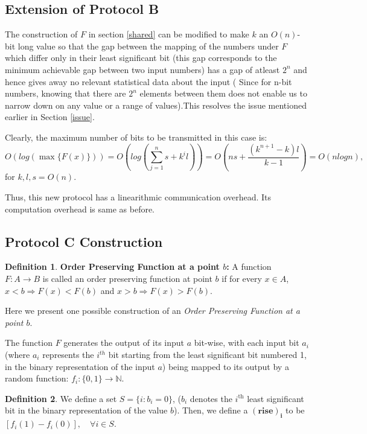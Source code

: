 \documentclass[11pt, letterpaper, romanappendices, onecolumn]{article}
\theoremstyle{plain}\newtheorem{thm}{Theorem}[section]
\theoremstyle{definition}
\newtheorem{defn}{Definition}[section]
\theoremstyle{remark}
\begin{document}
\subsection{Extension of Protocol \textsf{B}}\label{sec:ext}
The construction of $F$ in section \ref{shared} can be modified to make $k$ an $O(n)$-bit long value so that the gap between the mapping of the numbers under $F$ which differ only in their least significant bit (this gap corresponds to the minimum achievable gap between two input numbers) has a gap of atleast $2^n$ and hence gives away no relevant statistical data about the input ( Since for n-bit numbers, knowing that there are $2^n$ elements between them does not enable us to narrow down on any value or a range of values).This resolves the issue mentioned earlier in Section \ref{issue}.

\par Clearly, the maximum number of bits to be transmitted in this case is:
\[
	O(log(\max \lbrace F(x) \rbrace)) = O(log(\sum \limits_{j=1}^{n} s+k^i l)) =O(ns + \frac{(k^{n+1}-k)l}{k-1})=O(nlogn),
\]
for $k,l,s=O(n)$.

\par Thus, this new protocol has a linearithmic communication overhead. Its computation overhead is same as before.

\subsection{Protocol \textsf{C} Construction}
\begin{defn}
\textbf{Order Preserving Function at a point $b$:} A function $F: A \rightarrow B$ is called an order preserving function at point $b$ if for every $x \in A$, $x < b\Longrightarrow F(x) < F(b)$ and $x > b \Longrightarrow F(x) > F(b)$. 
\end{defn}

\par Here we present one possible construction of an \textit{Order Preserving Function at a point $b$}. 

\par The function $F$ generates the output of its input $a$ bit-wise, with each input bit $a_i$ (where $a_i$ represents the $i^{th}$ bit starting from the least significant bit numbered 1, in the binary representation of the input $a$) being mapped to its output by a random function: $f_i : \lbrace 0,1 \rbrace \longrightarrow \mathbb{N}$.
\begin{defn}\label{definerise}
We define a set $S=\lbrace i: b_i = 0 \rbrace$, ($b_i$ denotes the $i^\text{th}$ least significant bit in the binary representation of the value  $b$). Then, we define a $\mathbf{(rise)_i}$ to be $[f_i (1) -f_i(0)], \quad \forall i \in S$. 
\end{defn}
\end{document}
